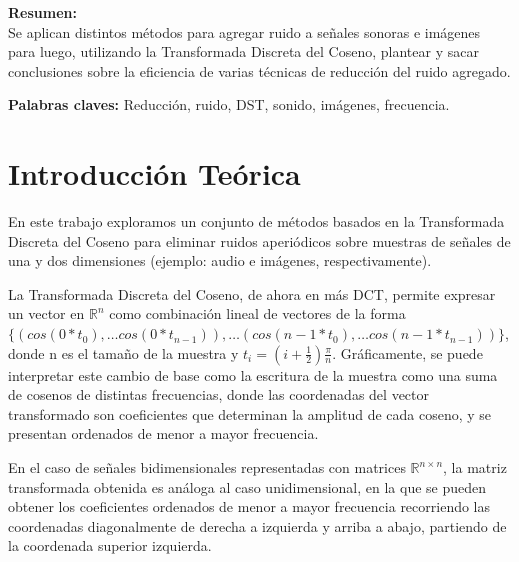 \documentclass[a4paper,10pt,twoside]{article}
\begin{document}
\textbf{Resumen:} \\
Se aplican distintos métodos para agregar ruido a señales sonoras e imágenes para luego, utilizando la Transformada Discreta del Coseno, plantear y sacar conclusiones sobre la eficiencia de varias técnicas de reducción del ruido agregado.

\textbf{Palabras claves:}
Reducción, ruido, DST, sonido, imágenes, frecuencia.
\newpage



\tableofcontents

\newpage



\section{Introducción Teórica}

En este trabajo exploramos un conjunto de métodos basados en la Transformada Discreta del Coseno para eliminar ruidos aperiódicos sobre muestras de señales de una y dos dimensiones (ejemplo: audio e imágenes, respectivamente).

La Transformada Discreta del Coseno, de ahora en más DCT, permite expresar un vector en $\mathbb{R}^n$ como combinación lineal de vectores de la forma $\{(cos(0 * t_0), \ldots cos(0 * t_{n-1})), \ldots (cos(n-1 * t_0), \ldots cos(n-1 * t_{n-1})) \}$, donde n es el tamaño de la muestra y $t_i = (i + \frac{1}{2})\frac{\pi}{n}$. Gráficamente, se puede interpretar este cambio de base como la escritura de la muestra como una suma de cosenos de distintas frecuencias, donde las coordenadas del vector transformado son coeficientes que determinan la amplitud de cada coseno, y se presentan ordenados de menor a mayor frecuencia.

En el caso de señales bidimensionales representadas con matrices $\mathbb{R}^{n \times n}$, la matriz transformada obtenida es análoga al caso unidimensional, en la que se pueden obtener los coeficientes ordenados de menor a mayor frecuencia recorriendo las coordenadas diagonalmente de derecha a izquierda y arriba a abajo, partiendo de la coordenada superior izquierda.
\end{document}

